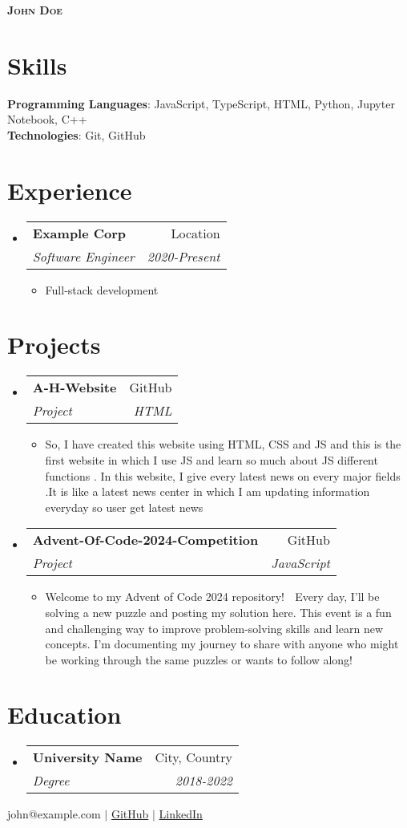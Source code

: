 \documentclass[letterpaper,11pt]{article}
\makeatletter
\newcommand{\resumeItem}[1]{
  \item\small{
    {#1 \vspace{-2pt}}
  }
}
\newcommand{\resumeSubheading}[4]{
  \vspace{-2pt}\item
    \begin{tabular*}{0.97\textwidth}[t]{l@{\extracolsep{\fill}}r}
      \textbf{#1} & #2 \\
      \textit{\small#3} & \textit{\small #4} \\
    \end{tabular*}\vspace{-7pt}
}
\newcommand{\resumeSubHeadingListStart}{\begin{itemize}[leftmargin=0.15in, label={}]}
\newcommand{\resumeSubHeadingListEnd}{\end{itemize}}
\newcommand{\resumeItemListStart}{\begin{itemize}}
\newcommand{\resumeItemListEnd}{\end{itemize}\vspace{-5pt}}
\makeatother
\begin{document}
\begin{center}
    \textbf{\Huge \scshape John Doe}
\end{center}

\section{Skills}
\begin{itemize}[leftmargin=0.15in, label={}]
    \small{\item{
    \textbf{Programming Languages}: JavaScript, TypeScript, HTML, Python, Jupyter Notebook, C++ \\
    \textbf{Technologies}: Git, GitHub \\
    }}
\end{itemize}

\section{Experience}
\resumeSubHeadingListStart
\resumeSubheading
            {Example Corp}{Location}
            {Software Engineer}{2020-Present}
            \resumeItemListStart
            \resumeItem{Full-stack development}
            \resumeItemListEnd
\resumeSubHeadingListEnd

\section{Projects}
\resumeSubHeadingListStart
\resumeSubheading
                {A-H-Website}{GitHub}
                {Project}{HTML}
                \resumeItemListStart
                \resumeItem{So, I have created this website using HTML, CSS and JS and this is the first website in which I use JS and learn so much about JS different functions . In this website, I give every latest news on every major fields .It is like a latest news center in which I am updating information everyday so user get latest news}
                \resumeItemListEnd
\resumeSubheading
                {Advent-Of-Code-2024-Competition}{GitHub}
                {Project}{JavaScript}
                \resumeItemListStart
                \resumeItem{Welcome to my Advent of Code 2024 repository! 🎉 Every day, I'll be solving a new puzzle and posting my solution here. This event is a fun and challenging way to improve problem-solving skills and learn new concepts. I'm documenting my journey to share with anyone who might be working through the same puzzles or wants to follow along!🌟}
                \resumeItemListEnd
\resumeSubHeadingListEnd

\section{Education}
\resumeSubHeadingListStart
\resumeSubheading{University Name}{City, Country}{Degree}{2018-2022}
\resumeSubHeadingListEnd

\begin{center}
\small john@example.com $|$ \href{https://github.com/HassanMehmood413}{GitHub} $|$ \href{https://www.linkedin.com/in/hassan-mehmood-01a3a9247/}{LinkedIn}
\end{center}
\end{document}
